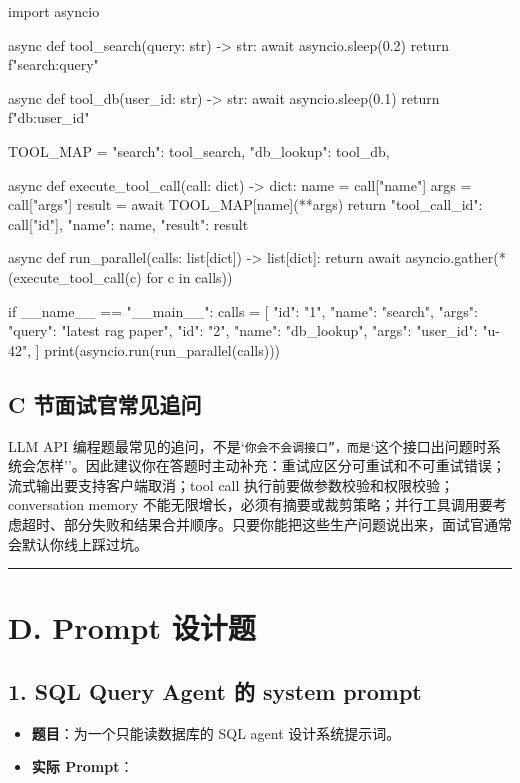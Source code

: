 \begin{codeblock}
import asyncio


async def tool_search(query: str) -> str:
    await asyncio.sleep(0.2)
    return f"search:{query}"


async def tool_db(user_id: str) -> str:
    await asyncio.sleep(0.1)
    return f"db:{user_id}"


TOOL_MAP = {
    "search": tool_search,
    "db_lookup": tool_db,
}


async def execute_tool_call(call: dict) -> dict:
    name = call["name"]
    args = call["args"]
    result = await TOOL_MAP[name](**args)
    return {"tool_call_id": call["id"], "name": name, "result": result}


async def run_parallel(calls: list[dict]) -> list[dict]:
    return await asyncio.gather(*(execute_tool_call(c) for c in calls))


if __name__ == "__main__":
    calls = [
        {"id": "1", "name": "search", "args": {"query": "latest rag paper"}},
        {"id": "2", "name": "db_lookup", "args": {"user_id": "u-42"}},
    ]
    print(asyncio.run(run_parallel(calls)))
\end{codeblock}

\subsection{C 节面试官常见追问}
LLM API 编程题最常见的追问，不是`\texttt{你会不会调接口''，而是}`这个接口出问题时系统会怎样''。因此建议你在答题时主动补充：重试应区分可重试和不可重试错误；流式输出要支持客户端取消；tool call 执行前要做参数校验和权限校验；conversation memory 不能无限增长，必须有摘要或裁剪策略；并行工具调用要考虑超时、部分失败和结果合并顺序。只要你能把这些生产问题说出来，面试官通常会默认你线上踩过坑。


\bigskip\hrule\bigskip

\section{D. Prompt 设计题}

\subsection{1. SQL Query Agent 的 system prompt}
\begin{itemize}[leftmargin=2em]
\item \textbf{题目}：为一个只能读数据库的 SQL agent 设计系统提示词。
\item \textbf{实际 Prompt}：
\end{itemize}

